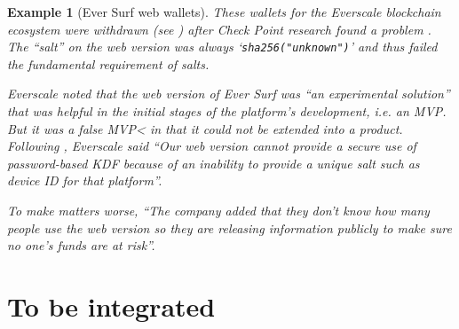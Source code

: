 \documentclass{article}
\newtheorem{example}{Example}
\begin{document}
\begin{example}[Ever Surf web wallets]\rm
These wallets for the Everscale blockchain ecosystem were withdrawn (see \cite{Greig2022r}) after Check Point research found a problem \cite{CheckPoint2022d}.  The ``salt'' on the web version was always `\verb+sha256("unknown")+' and thus failed the fundamental requirement of salts. 
\par
Everscale noted that the web version of Ever Surf was ``an experimental solution'' that was helpful in the initial stages of the platform’s development, i.e. an MVP. But it was a false MVP< in that it could not be extended into a product. Following \cite{CheckPoint2022d}, Everscale said ``Our web version cannot provide a secure use of password-based KDF because of an inability to provide a unique salt such as device ID for that platform''.
\par
To make matters worse, ``The company added that they don't know how many people use the web version so they are releasing information publicly to make sure no one's funds are at risk''.
\end{example}
\section{To be integrated}
\cite{Hughes2021v,CISQ2021a,NIST2016d}
\cite{Woodcocketal2010a}

\end{document}
